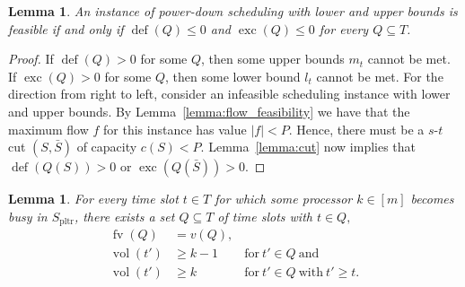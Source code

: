\documentclass[a4paper]{article}
\DeclareMathOperator{\pltr}{pltr}
\DeclareMathOperator{\fv}{fv}
\DeclareMathOperator{\vol}{vol}
\DeclareMathOperator{\opdef}{def}
\DeclareMathOperator{\exc}{exc}
\newtheorem{lemma}[theorem]{Lemma}
\begin{document}
\begin{lemma}\label{lemma:feasibility}
  An instance of power-down scheduling with lower and upper bounds is feasible if and only if $\opdef(Q) \leq 0$ and $\exc(Q) \leq 0$ for every $Q \subseteq T$.
\end{lemma}
\begin{proof}
  If $\opdef(Q) > 0$ for some $Q$, then some upper bounds $m_t$ cannot be met.
  If $\exc(Q) > 0$ for some $Q$, then some lower bound $l_t$ cannot be met.
  For the direction from right to left, consider an infeasible scheduling instance with lower and upper bounds.
  By Lemma~\ref{lemma:flow_feasibility} we have that the maximum flow $f$ for this instance has value $|f| < P$.
  Hence, there must be a $s$-$t$ cut $(S, \bar S)$ of capacity $c(S) < P$.
  Lemma~\ref{lemma:cut} now implies that $\opdef(Q(S)) > 0$ or $\exc(Q(\bar S)) > 0$.
\end{proof}
\begin{lemma}\label{lemma:critical}
  For every time slot $t \in T$ for which some processor $k \in [m]$ becomes busy in $S_{\pltr}$, there exists a set $Q \subseteq T$ of time slots with $t \in Q, $
  \begin{align}
    \fv(Q) &= v(Q) \text{,}\\
    \vol(t') &\geq k-1 &~\text{for}~t' \in Q~\text{and}\\
    \vol(t') &\geq k &~\text{for}~t' \in Q~\text{with}~t' \geq t \text{.}
  \end{align}
\end{lemma}
\end{document}
